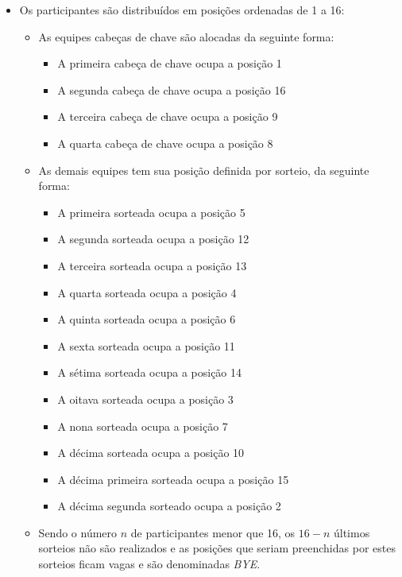 \begin{itemize}[noitemsep]
	\item Os participantes são distribuídos em posições ordenadas de 1 a 16:
	\begin{itemize}[noitemsep]
		\item As equipes cabeças de chave são alocadas da seguinte forma:
		\begin{itemize}[noitemsep]
			\item A primeira cabeça de chave ocupa a posição 1
			\item A segunda cabeça de chave ocupa a posição 16
			\item A terceira cabeça de chave ocupa a posição 9
			\item A quarta cabeça de chave ocupa a posição 8
		\end{itemize}

		\item As demais equipes tem sua posição definida por sorteio, da seguinte forma:
		\begin{itemize}[noitemsep]
			\item A primeira sorteada ocupa a posição 5
			\item A segunda sorteada ocupa a posição 12
			\item A terceira sorteada ocupa a posição 13
			\item A quarta sorteada ocupa a posição 4
			\item A quinta sorteada ocupa a posição 6
			\item A sexta sorteada ocupa a posição 11
			\item A sétima sorteada ocupa a posição 14
			\item A oitava sorteada ocupa a posição 3
			\item A nona sorteada ocupa a posição 7
			\item A décima sorteada ocupa a posição 10
			\item A décima primeira sorteada ocupa a posição 15
			\item A décima segunda sorteado ocupa a posição 2
		\end{itemize}

		\item Sendo o número $n$ de participantes menor que 16, os $16 - n$ últimos sorteios não são realizados e as posições que seriam preenchidas por estes sorteios ficam vagas e são denominadas \textit{BYE}.
	\end{itemize}


\end{itemize}
